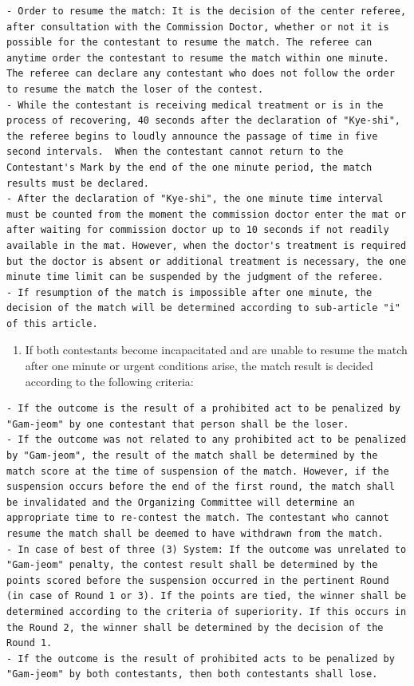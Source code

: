 \documentclass[
]{report}
\providecommand{\tightlist}{%
  \setlength{\itemsep}{0pt}\setlength{\parskip}{0pt}}
\renewcommand{\labelenumi}{\arabic{enumi}}
\begin{document}
\begin{verbatim}
- Order to resume the match: It is the decision of the center referee, after consultation with the Commission Doctor, whether or not it is possible for the contestant to resume the match. The referee can anytime order the contestant to resume the match within one minute. The referee can declare any contestant who does not follow the order to resume the match the loser of the contest.
- While the contestant is receiving medical treatment or is in the process of recovering, 40 seconds after the declaration of "Kye-shi", the referee begins to loudly announce the passage of time in five second intervals.  When the contestant cannot return to the Contestant's Mark by the end of the one minute period, the match results must be declared.
- After the declaration of "Kye-shi", the one minute time interval must be counted from the moment the commission doctor enter the mat or after waiting for commission doctor up to 10 seconds if not readily available in the mat. However, when the doctor's treatment is required but the doctor is absent or additional treatment is necessary, the one minute time limit can be suspended by the judgment of the referee.
- If resumption of the match is impossible after one minute, the decision of the match will be determined according to sub-article "i" of this article.
\end{verbatim}

\begin{enumerate}
\def\labelenumi{\roman{enumi}.}
\setcounter{enumi}{2}
\tightlist
\item
  If both contestants become incapacitated and are unable to resume the
  match after one minute or urgent conditions arise, the match result is
  decided according to the following criteria:
\end{enumerate}

\begin{verbatim}
- If the outcome is the result of a prohibited act to be penalized by "Gam-jeom" by one contestant that person shall be the loser.
- If the outcome was not related to any prohibited act to be penalized by "Gam-jeom", the result of the match shall be determined by the match score at the time of suspension of the match. However, if the suspension occurs before the end of the first round, the match shall be invalidated and the Organizing Committee will determine an appropriate time to re-contest the match. The contestant who cannot resume the match shall be deemed to have withdrawn from the match.
- In case of best of three (3) System: If the outcome was unrelated to "Gam-jeom" penalty, the contest result shall be determined by the points scored before the suspension occurred in the pertinent Round (in case of Round 1 or 3). If the points are tied, the winner shall be determined according to the criteria of superiority. If this occurs in the Round 2, the winner shall be determined by the decision of the Round 1.
- If the outcome is the result of prohibited acts to be penalized by "Gam-jeom" by both contestants, then both contestants shall lose.
\end{verbatim}
\end{document}
